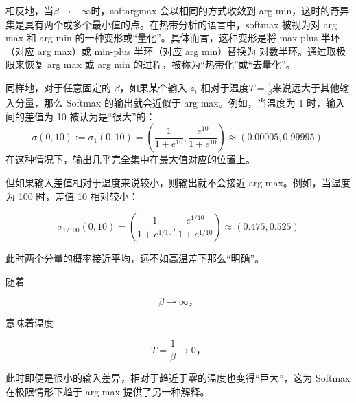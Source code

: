 相反地，当$\beta \to -\infty$时，softargmax 会以相同的方式收敛到 arg min，这时的奇异集是具有两个或多个最小值的点。在热带分析的语言中，softmax 被视为对 arg max 和 arg min 的一种变形或“量化”。具体而言，这种变形是将 max-plus 半环（对应 arg max）或 min-plus 半环（对应 arg min）替换为 对数半环。通过取极限来恢复 arg max 或 arg min 的过程，被称为“热带化”或“去量化”。

同样地，对于任意固定的 $\beta$，如果某个输入 $z_i$ 相对于温度$T = \frac{1}{\beta}$来说远大于其他输入分量，那么 Softmax 的输出就会近似于 arg max。例如，当温度为 1 时，输入间的差值为 10 被认为是“很大”的：
$$
\sigma(0, 10) := \sigma_1(0, 10) = \left( \frac{1}{1 + e^{10}}, \frac{e^{10}}{1 + e^{10}} \right) \approx (0.00005, 0.99995)~
$$
在这种情况下，输出几乎完全集中在最大值对应的位置上。

但如果输入差值相对于温度来说较小，则输出就不会接近 arg max。例如，当温度为 100 时，差值 10 相对较小：

$$
\sigma_{1/100}(0, 10) = \left( \frac{1}{1 + e^{1/10}}, \frac{e^{1/10}}{1 + e^{1/10}} \right) \approx (0.475, 0.525)
$$

此时两个分量的概率接近平均，远不如高温差下那么“明确”。


随着

$$
\beta \to \infty，
$$

意味着温度

$$
T = \frac{1}{\beta} \to 0，
$$

此时即便是很小的输入差异，相对于趋近于零的温度也变得“巨大”，这为 Softmax 在极限情形下趋于 arg max 提供了另一种解释。
